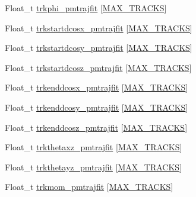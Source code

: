 \begin{DoxyCompactItemize}
\item 
Float\-\_\-t \hyperlink{classanatree_a6db840bbaff1fe7965232ec3548a2da9}{trkphi\-\_\-pmtrajfit} \mbox{[}\hyperlink{anatree__core__v09410002__orig_8h_a327fd4e796e4a0d78947524c96e4362e}{M\-A\-X\-\_\-\-T\-R\-A\-C\-K\-S}\mbox{]}
\item 
Float\-\_\-t \hyperlink{classanatree_a8acce8ecb09cdf3b6b4dcacf732ff21d}{trkstartdcosx\-\_\-pmtrajfit} \mbox{[}\hyperlink{anatree__core__v09410002__orig_8h_a327fd4e796e4a0d78947524c96e4362e}{M\-A\-X\-\_\-\-T\-R\-A\-C\-K\-S}\mbox{]}
\item 
Float\-\_\-t \hyperlink{classanatree_acd3ee8ea7c8c818eedc2f0ebc92545a4}{trkstartdcosy\-\_\-pmtrajfit} \mbox{[}\hyperlink{anatree__core__v09410002__orig_8h_a327fd4e796e4a0d78947524c96e4362e}{M\-A\-X\-\_\-\-T\-R\-A\-C\-K\-S}\mbox{]}
\item 
Float\-\_\-t \hyperlink{classanatree_a8364a06165a45dab496f635602256c8c}{trkstartdcosz\-\_\-pmtrajfit} \mbox{[}\hyperlink{anatree__core__v09410002__orig_8h_a327fd4e796e4a0d78947524c96e4362e}{M\-A\-X\-\_\-\-T\-R\-A\-C\-K\-S}\mbox{]}
\item 
Float\-\_\-t \hyperlink{classanatree_a7ff6f93928b5a3e1a618ffda2e6f5886}{trkenddcosx\-\_\-pmtrajfit} \mbox{[}\hyperlink{anatree__core__v09410002__orig_8h_a327fd4e796e4a0d78947524c96e4362e}{M\-A\-X\-\_\-\-T\-R\-A\-C\-K\-S}\mbox{]}
\item 
Float\-\_\-t \hyperlink{classanatree_a48b831c5c0b76ebd1f5cfea2e89be249}{trkenddcosy\-\_\-pmtrajfit} \mbox{[}\hyperlink{anatree__core__v09410002__orig_8h_a327fd4e796e4a0d78947524c96e4362e}{M\-A\-X\-\_\-\-T\-R\-A\-C\-K\-S}\mbox{]}
\item 
Float\-\_\-t \hyperlink{classanatree_ac0bb16a328970bbfaf5956b525b2d253}{trkenddcosz\-\_\-pmtrajfit} \mbox{[}\hyperlink{anatree__core__v09410002__orig_8h_a327fd4e796e4a0d78947524c96e4362e}{M\-A\-X\-\_\-\-T\-R\-A\-C\-K\-S}\mbox{]}
\item 
Float\-\_\-t \hyperlink{classanatree_ad53fc5e3baf134af1a6c5ff0e77319c1}{trkthetaxz\-\_\-pmtrajfit} \mbox{[}\hyperlink{anatree__core__v09410002__orig_8h_a327fd4e796e4a0d78947524c96e4362e}{M\-A\-X\-\_\-\-T\-R\-A\-C\-K\-S}\mbox{]}
\item 
Float\-\_\-t \hyperlink{classanatree_a3cb86d98b107817c512e85bca2ad32cc}{trkthetayz\-\_\-pmtrajfit} \mbox{[}\hyperlink{anatree__core__v09410002__orig_8h_a327fd4e796e4a0d78947524c96e4362e}{M\-A\-X\-\_\-\-T\-R\-A\-C\-K\-S}\mbox{]}
\item 
Float\-\_\-t \hyperlink{classanatree_a74fe2d3cfc1dad1efb636467ebb0d90d}{trkmom\-\_\-pmtrajfit} \mbox{[}\hyperlink{anatree__core__v09410002__orig_8h_a327fd4e796e4a0d78947524c96e4362e}{M\-A\-X\-\_\-\-T\-R\-A\-C\-K\-S}\mbox{]}

\end{DoxyCompactItemize}

